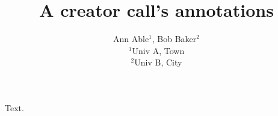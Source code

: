 \documentclass{article}
\makeatletter
\providecommand\lx@add@creator[2][]{#2}
\providecommand\lx@add@affiliation[2][]{}
\makeatother
\begin{document}
\title{A creator call's annotations}
\makeatletter
\author{Ann Able$^{1}$, \lx@add@creator[role=editor,annotations={ed}]{Bob Baker}$^{2}$\\
$^{1}$Univ A, Town\\ $^{2}$Univ B, City}
\lx@add@affiliation[label=ed]{Editorial Office}
\makeatother
\maketitle
Text.
\end{document}
